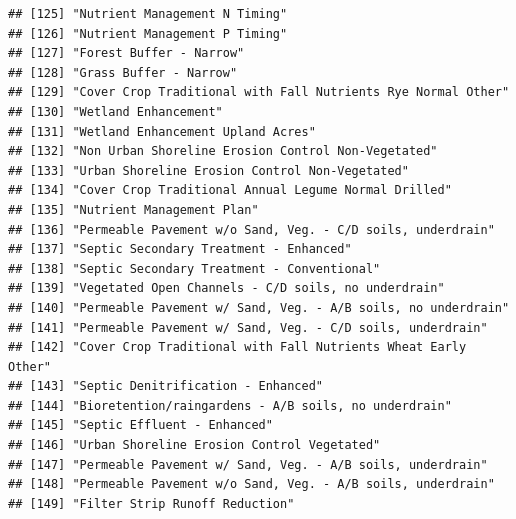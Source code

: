 \documentclass[
]{article}
\begin{document}
\begin{verbatim}
## [125] "Nutrient Management N Timing"                                                                   
## [126] "Nutrient Management P Timing"                                                                   
## [127] "Forest Buffer - Narrow"                                                                         
## [128] "Grass Buffer - Narrow"                                                                          
## [129] "Cover Crop Traditional with Fall Nutrients Rye Normal Other"                                    
## [130] "Wetland Enhancement"                                                                            
## [131] "Wetland Enhancement Upland Acres"                                                               
## [132] "Non Urban Shoreline Erosion Control Non-Vegetated"                                              
## [133] "Urban Shoreline Erosion Control Non-Vegetated"                                                  
## [134] "Cover Crop Traditional Annual Legume Normal Drilled"                                            
## [135] "Nutrient Management Plan"                                                                       
## [136] "Permeable Pavement w/o Sand, Veg. - C/D soils, underdrain"                                      
## [137] "Septic Secondary Treatment - Enhanced"                                                          
## [138] "Septic Secondary Treatment - Conventional"                                                      
## [139] "Vegetated Open Channels - C/D soils, no underdrain"                                             
## [140] "Permeable Pavement w/ Sand, Veg. - A/B soils, no underdrain"                                    
## [141] "Permeable Pavement w/ Sand, Veg. - C/D soils, underdrain"                                       
## [142] "Cover Crop Traditional with Fall Nutrients Wheat Early Other"                                   
## [143] "Septic Denitrification - Enhanced"                                                              
## [144] "Bioretention/raingardens - A/B soils, no underdrain"                                            
## [145] "Septic Effluent - Enhanced"                                                                     
## [146] "Urban Shoreline Erosion Control Vegetated"                                                      
## [147] "Permeable Pavement w/ Sand, Veg. - A/B soils, underdrain"                                       
## [148] "Permeable Pavement w/o Sand, Veg. - A/B soils, underdrain"                                      
## [149] "Filter Strip Runoff Reduction"                                                                  

\end{verbatim}
\end{document}
